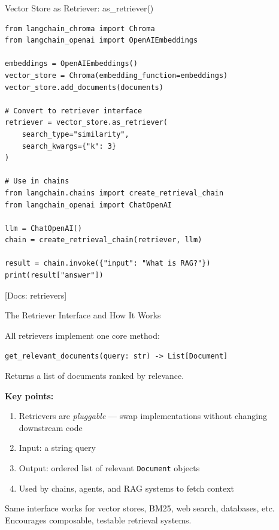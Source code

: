 \documentclass[aspectratio=169,11pt]{beamer}
\newcommand{\docref}[1]{{\scriptsize\color{docgray}[Docs: #1]}}
\begin{document}
\begin{frame}[fragile]{Vector Store as Retriever: as\_retriever()}
  \begin{lstlisting}
from langchain_chroma import Chroma
from langchain_openai import OpenAIEmbeddings

embeddings = OpenAIEmbeddings()
vector_store = Chroma(embedding_function=embeddings)
vector_store.add_documents(documents)

# Convert to retriever interface
retriever = vector_store.as_retriever(
    search_type="similarity",
    search_kwargs={"k": 3}
)

# Use in chains
from langchain.chains import create_retrieval_chain
from langchain_openai import ChatOpenAI

llm = ChatOpenAI()
chain = create_retrieval_chain(retriever, llm)

result = chain.invoke({"input": "What is RAG?"})
print(result["answer"])
  \end{lstlisting}

  \docref{retrievers}
\end{frame}

\begin{frame}[shrink=8]{The Retriever Interface and How It Works}
  \begin{conceptbox}
    All retrievers implement one core method:
    \begin{center}
      \texttt{get\_relevant\_documents(query: str) -> List[Document]}
    \end{center}
    Returns a list of documents ranked by relevance.
  \end{conceptbox}

  \vspace{0.05cm}
  \textbf{Key points:}
  \begin{enumerate}
    \setlength{\itemsep}{0pt}
    \item Retrievers are \emph{pluggable} — swap implementations without changing downstream code
    \item Input: a string query
    \item Output: ordered list of relevant \texttt{Document} objects
    \item Used by chains, agents, and RAG systems to fetch context
  \end{enumerate}

  \vspace{0.05cm}
  \begin{tipbox}
    Same interface works for vector stores, BM25, web search, databases, etc.\\
    Encourages composable, testable retrieval systems.
  \end{tipbox}
\end{frame}
\end{document}
